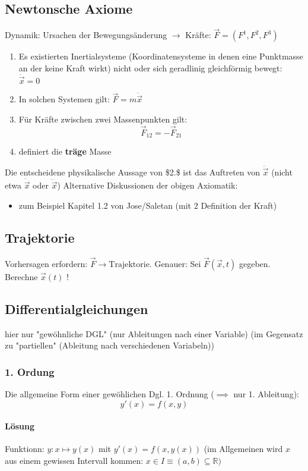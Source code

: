 \documentclass[a4paper]{scrartcl}
\renewcommand{\v}[1]{\vec{#1}}
\theoremstyle{definition}
\theoremstyle{plain}
\theoremstyle{remark}
\theoremstyle{remark}
\begin{document}
\subsection{Newtonsche Axiome}
\label{sec-3-1}
Dynamik: Ursachen der Bewegungsänderung $\rightarrow$ Kräfte: $\v F = (F^1,F^2,F^3)$
\begin{enumerate}
\item Es existierten Inertialsysteme (Koordinatensysteme in denen eine Punktmasse an der keine Kraft wirkt) nicht oder sich geradlinig gleichförmig bewegt: $\ddot{\v x} = 0$
\item In solchen Systemen gilt: $\v F = m\ddot{\v x}$
\item Für Kräfte zwischen zwei Massenpunkten gilt:
\[\v{F}_12 = -\v{F}_21\]

\item definiert die \textbf{träge} Masse
\end{enumerate}
Die entscheidene physikalische Aussage von \$2.\$ ist das Auftreten von $\ddot{\v x}$ (nicht etwa $\dot{\v x}$ oder $\dddot{\v x}$)
Alternative Diskussionen der obigen Axiomatik:
\begin{itemize}
\item zum Beispiel Kapitel 1.2 von Jose/Saletan (mit $2$ Definition der Kraft)
\end{itemize}
\subsection{Trajektorie}
\label{sec-3-2}
Vorhersagen erfordern: $\v F \rightarrow \text{Trajektorie}$. Genauer: Sei $\v F(\v x,t)$ gegeben. Berechne $\v x(t)$ !
\subsection{Differentialgleichungen}
\label{sec-3-3}
hier nur "gewöhnliche DGL" (nur Ableitungen nach einer Variable) (im Gegensatz zu "partiellen" (Ableitung nach verschiedenen Variabeln))
\subsubsection{1. Ordung}
\label{sec-3-3-1}
Die allgemeine Form einer gewöhlichen Dgl. 1. Ordnung ($\implies$ nur 1. Ableitung):
\[y'(x) = f(x,y)\]
\paragraph{Lösung}
\label{sec-3-3-1-1}
Funktionn: $y:x\mapsto y(x)$ mit $y'(x) = f(x,y(x))$ (im Allgemeinen wird $x$ aus einem gewissen Intervall kommen: $x\in I\equiv (a,b)\subseteq \mathbb{R})$
\end{document}

